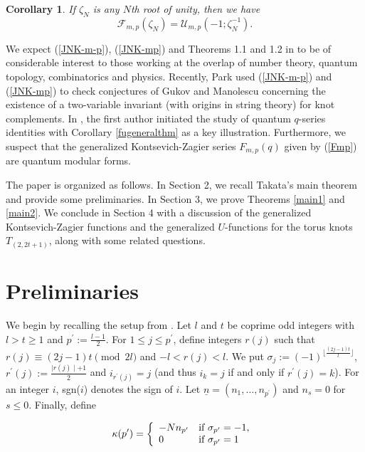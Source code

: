 \documentclass[11pt,reqno]{amsart}
\newtheorem{corollary}[theorem]{Corollary}
\theoremstyle{definition}
\numberwithin{equation}{section}
\begin{document}
\begin{corollary} \label{calFcalU} If $\zeta_N$ is any $N$th root of unity, then we have
\begin{equation}
\mathcal{F}_{m,p}(\zeta_N) = \mathcal{U}_{m,p}(-1; \zeta_N^{-1}).
\end{equation}
\end{corollary}

We expect (\ref{JNK-m-p}), (\ref{JNK-mp}) and Theorems 1.1 and 1.2 in \cite{lo2} to be of considerable interest to those working at the overlap of number theory, quantum topology, combinatorics and physics. Recently, Park \cite{park} used (\ref{JNK-m-p}) and (\ref{JNK-mp}) to check conjectures of Gukov and Manolescu \cite{gm} concerning the existence of a two-variable invariant (with origins in string theory) for knot complements. In \cite{lovejoyqqid}, the first author initiated the study of quantum $q$-series identities with Corollary \ref{fugeneralthm} as a key illustration. Furthermore, we suspect that the generalized Kontsevich-Zagier series $F_{m,p}(q)$ given by (\ref{Fmp}) are quantum modular forms. 

The paper is organized as follows. In Section 2, we recall Takata's main theorem and provide some preliminaries. In Section 3, we prove Theorems \ref{main1} and \ref{main2}.  We conclude in Section 4 with a discussion of the generalized Kontsevich-Zagier functions and the generalized $U$-functions for the torus knots $T_{(2,2t+1)}$, along with some related questions.

\section{Preliminaries}

We begin by recalling the setup from \cite{takata}. Let $l$ and $t$ be coprime odd integers with $l > t \geq 1$ and $p^{\prime} := \frac{l-1}{2}$. For $1 \leq j \leq p^{\prime}$, define integers $r(j)$ such that $r(j) \equiv (2j-1)t \pmod{2l}$ and $-l < r(j) < l$. We put $\sigma_j := (-1)^{\lfloor \frac{(2j-1)t}{l}\rfloor}$, $r^{\prime}(j) := \frac{\mid r(j) \mid + 1}{2}$ and $i_{r^{\prime}(j)}=j$ (and thus $i_k = j$ if and only if $r^{\prime}(j)=k$). For an integer $i$, sgn($i$) denotes the sign of $i$. Let $\underline{n} = (n_1, \dotsc, n_{p^{\prime}})$ and $n_s=0$ for $s \leq 0$. Finally, define

\begin{equation} \label{kappa}
\kappa(p^{\prime})= \left\{
\begin{array}{ll}
-Nn_{p^{\prime}} & \text{if $\sigma_{p^{\prime}}=-1$,} \\
0 & \text{if $\sigma_{p^{\prime}}=1$} \\
\end{array} \right. \\
\end{equation}
\end{document}
